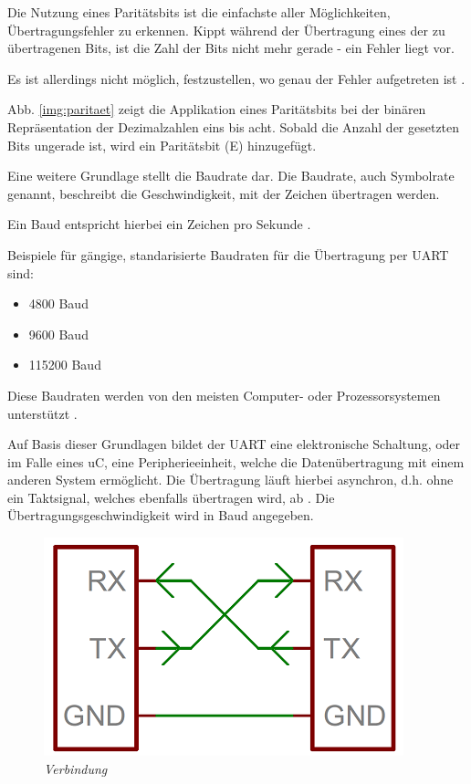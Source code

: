 \smallskip
Die Nutzung eines Paritätsbits ist die einfachste aller Möglichkeiten, Übertragungsfehler zu erkennen. Kippt während der Übertragung eines
der zu übertragenen Bits, ist die Zahl der Bits nicht mehr gerade - ein Fehler liegt vor.

Es ist allerdings nicht möglich, festzustellen, wo genau der Fehler aufgetreten ist \citep{Bussysteme}.

\smallskip

Abb. \ref{img:paritaet} zeigt die Applikation eines Paritätsbits bei der binären Repräsentation der Dezimalzahlen eins bis acht. Sobald die Anzahl der 
gesetzten Bits ungerade ist, wird ein Paritätsbit (E) hinzugefügt.

\smallskip

Eine weitere Grundlage stellt die Baudrate dar.
Die Baudrate, auch Symbolrate genannt, beschreibt die Geschwindigkeit, mit der Zeichen übertragen werden.

Ein Baud entspricht hierbei ein Zeichen pro Sekunde \citep{Bussysteme}.

Beispiele für gängige, standarisierte Baudraten für die Übertragung per \ac{UART} sind:

\begin{itemize}
    \item 4800 Baud
    \item 9600 Baud
    \item 115200 Baud
\end{itemize}

Diese Baudraten werden von den meisten Computer- oder Prozessorsystemen unterstützt \citep{Bussysteme}.

\newpage


Auf Basis dieser Grundlagen bildet der \acl{UART} eine elektronische Schaltung, oder im Falle eines \ac{uC}, eine Peripherieeinheit, welche
die Datenübertragung mit einem anderen System ermöglicht. Die Übertragung läuft hierbei asynchron,
d.h. ohne ein Taktsignal, welches ebenfalls übertragen wird, ab \citep{Bussysteme}. Die Übertragungsgeschwindigkeit
wird in Baud angegeben.

\smallskip

\begin{figure}
     \vspace{-\baselineskip}
         \centering
         \includegraphics[scale=0.45]{Pictures/uart_rx_tx.png}
         \caption{\textit{Verbindung \citep{ImgRXTX}}}
         \label{img:uart_rxtx}
 \end{figure}


